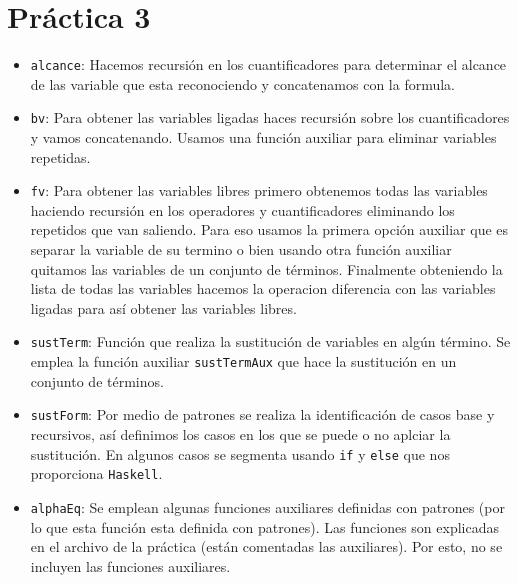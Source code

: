 \documentclass{article}
\newcommand{\code}[1]{\textcolor{white!25!black}{\texttt{#1}}}
\begin{document}
\section*{\LARGE{Práctica 3}}
\newcommand{\localtextbulletone}{\textcolor{black}{\raisebox{.45ex}{\rule{.6ex}{.6ex}}}}
\renewcommand{\labelitemi}{\localtextbulletone}
\begin{itemize}
    \item \code{alcance}: Hacemos recursión en los cuantificadores para determinar el alcance de las variable que esta reconociendo y concatenamos con la formula. 
  
    \item \code{bv}: Para obtener las variables ligadas haces recursión sobre los cuantificadores y vamos concatenando. Usamos una función auxiliar para eliminar variables repetidas. 
  
    \item \code{fv}: Para obtener las variables libres primero obtenemos todas las variables haciendo recursión en los operadores y cuantificadores eliminando los repetidos que van saliendo. Para eso usamos la primera opción auxiliar que es separar la variable de su termino o bien usando otra función auxiliar quitamos las variables de un conjunto de términos. Finalmente obteniendo la lista de todas las variables hacemos la operacion diferencia con las variables ligadas para así obtener las variables libres.
  
    \item \code{sustTerm}: Función que realiza la sustitución de variables en algún término.
    Se emplea la función auxiliar \code{sustTermAux} que hace la sustitución en un conjunto de términos.
  
    \item \code{sustForm}: Por medio de patrones se realiza la identificación de casos base y recursivos, así definimos los casos en los que se puede o no aplciar la sustitución.
    En algunos casos se segmenta usando \code{if} y \code{else} que nos proporciona \code{Haskell}.
  
  \item \code{alphaEq}: Se emplean algunas funciones auxiliares definidas con patrones (por lo que esta función esta definida con patrones).
    Las funciones son explicadas en el archivo de la práctica (están comentadas las auxiliares). Por esto, no se incluyen las funciones auxiliares.
\end{itemize}
\begin{center}
\end{center}
\end{document}
